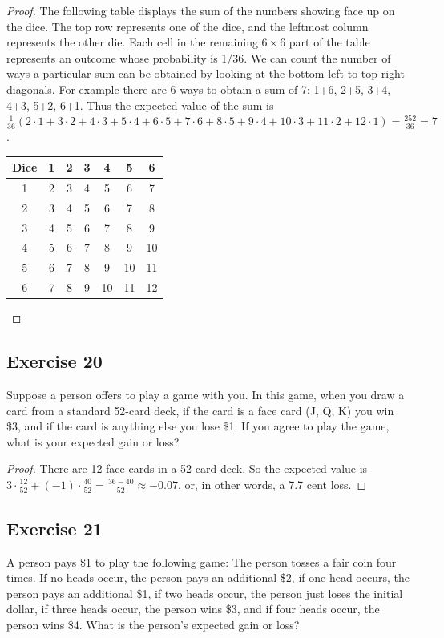 \documentclass[14pt]{extarticle}
\begin{document}
\begin{proof}
The following table displays the sum of the numbers showing face up on the dice. The top row represents one of the dice, 
and the leftmost column represents the other die. Each cell in the remaining \(6 \times 6\) part of the table represents an 
outcome whose probability is 1/36. We can count the number of ways a particular sum can be obtained by looking at the 
bottom-left-to-top-right diagonals. For example there are 6 ways to obtain a sum of 7: 1+6, 2+5, 3+4, 4+3, 5+2, 6+1. Thus 
the expected value of the sum is \(\frac{1}{36}(2 \cdot 1 + 3 \cdot 2 + 4 \cdot 3 + 5 \cdot 4 + 6 \cdot 5 + 7 \cdot 6 + 8 \cdot 5 + 9 \cdot 4 + 10 \cdot 3 + 11 \cdot 2 + 12 \cdot 1) = \frac{252}{36} = 7\).
\begin{center}
\begin{tabular}{c|c|c|c|c|c|c|}
Dice&1&2&3&4&5&6 \\
\hline
1&2&3&4&5&6&7 \\
\hline
2&3&4&5&6&7&8 \\
\hline
3&4&5&6&7&8&9 \\
\hline
4&5&6&7&8&9&10 \\
\hline
5&6&7&8&9&10&11 \\
\hline
6&7&8&9&10&11&12 \\
\hline
\end{tabular}
\end{center}
\end{proof}

\subsection{Exercise 20}
Suppose a person offers to play a game with you. In this game, when you draw a card from a standard 52-card deck, if the card 
is a face card (J, Q, K) you win \$3, and if the card is anything else you lose \$1. If you agree to play the game, 
what is your expected gain or loss?

\begin{proof}
There are 12 face cards in a 52 card deck. So the expected value is \(3 \cdot \frac{12}{52} + (-1) \cdot \frac{40}{52}
= \frac{36-40}{52} \approx -0.07\), or, in other words, a 7.7 cent loss.
\end{proof}

\subsection{Exercise 21}
A person pays \$1 to play the following game: The person tosses a fair coin four times. If no heads occur, the person 
pays an additional \$2, if one head occurs, the person pays an additional \$1, if two heads occur, the person just loses the 
initial dollar, if three heads occur, the person wins \$3, and if four heads occur, the person wins \$4. What is the person’s 
expected gain or loss?
\end{document}

